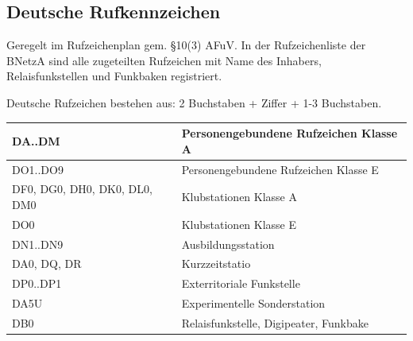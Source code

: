 \documentclass[11pt,BCOR=8.5mm]{scrartcl}
\begin{document}
\subsection{Deutsche Rufkennzeichen}\label{sub:deutsche_rufkennzeichen}
Geregelt im Rufzeichenplan gem. §10(3) AFuV. In der Rufzeichenliste der
BNetzA sind alle zugeteilten Rufzeichen mit Name des Inhabers,
Relaisfunkstellen und Funkbaken registriert.

Deutsche Rufzeichen bestehen aus: 2 Buchstaben + Ziffer + 1-3
Buchstaben.

\begin{table}[h]
  \centering
\begin{tabular}{|l|l|}
  \hline
  DA..DM & Personengebundene Rufzeichen Klasse A\\
  \hline
  DO1..DO9 & Personengebundene Rufzeichen Klasse E\\
  \hline
  DF0, DG0, DH0, DK0, DL0, DM0 & Klubstationen Klasse A \\
  \hline
  DO0 & Klubstationen Klasse E \\
  \hline
  DN1..DN9 & Ausbildungsstation \\
  \hline
  DA0, DQ, DR & Kurzzeitstatio \\
  \hline
  DP0..DP1 & Exterritoriale Funkstelle \\
  \hline
  DA5U & Experimentelle Sonderstation \\
  \hline
  DB0 & Relaisfunkstelle, Digipeater, Funkbake\\
  \hline
\end{tabular}
\end{table}
\end{document}
